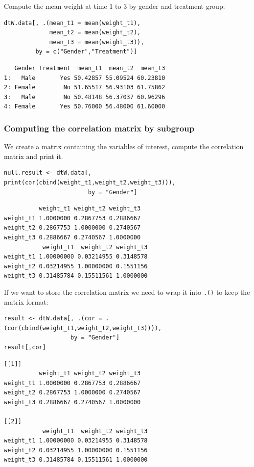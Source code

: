 \documentclass{article}
\begin{document}
Compute the mean weight at time 1 to 3 by gender and treatment group:
\lstset{language=r,label= ,caption= ,captionpos=b,numbers=none}
\begin{lstlisting}
dtW.data[, .(mean_t1 = mean(weight_t1),
			 mean_t2 = mean(weight_t2),
			 mean_t3 = mean(weight_t3)), 
		 by = c("Gender","Treatment")]
\end{lstlisting}

\begin{verbatim}
   Gender Treatment  mean_t1  mean_t2  mean_t3
1:   Male       Yes 50.42857 55.09524 60.23810
2: Female        No 51.65517 56.93103 61.75862
3:   Male        No 50.48148 56.37037 60.96296
4: Female       Yes 50.76000 56.48000 61.60000
\end{verbatim}

\subsubsection{Computing the correlation matrix by subgroup}
\label{sec:orgfe4e470}

We create a matrix containing the variables of interest, compute the
correlation matrix and print it.
\lstset{language=r,label= ,caption= ,captionpos=b,numbers=none}
\begin{lstlisting}
null.result <- dtW.data[, print(cor(cbind(weight_t1,weight_t2,weight_t3))), 
						by = "Gender"]
\end{lstlisting}

\begin{verbatim}
          weight_t1 weight_t2 weight_t3
weight_t1 1.0000000 0.2867753 0.2886667
weight_t2 0.2867753 1.0000000 0.2740567
weight_t3 0.2886667 0.2740567 1.0000000
           weight_t1  weight_t2 weight_t3
weight_t1 1.00000000 0.03214955 0.3148578
weight_t2 0.03214955 1.00000000 0.1551156
weight_t3 0.31485784 0.15511561 1.0000000
\end{verbatim}

If we want to store the correlation matrix we need to wrap it into
\texttt{.()} to keep the matrix format:
\lstset{language=r,label= ,caption= ,captionpos=b,numbers=none}
\begin{lstlisting}
result <- dtW.data[, .(cor = .(cor(cbind(weight_t1,weight_t2,weight_t3)))), 
				   by = "Gender"]
result[,cor]
\end{lstlisting}

\begin{verbatim}
[[1]]
          weight_t1 weight_t2 weight_t3
weight_t1 1.0000000 0.2867753 0.2886667
weight_t2 0.2867753 1.0000000 0.2740567
weight_t3 0.2886667 0.2740567 1.0000000

[[2]]
           weight_t1  weight_t2 weight_t3
weight_t1 1.00000000 0.03214955 0.3148578
weight_t2 0.03214955 1.00000000 0.1551156
weight_t3 0.31485784 0.15511561 1.0000000
\end{verbatim}
\end{document}
